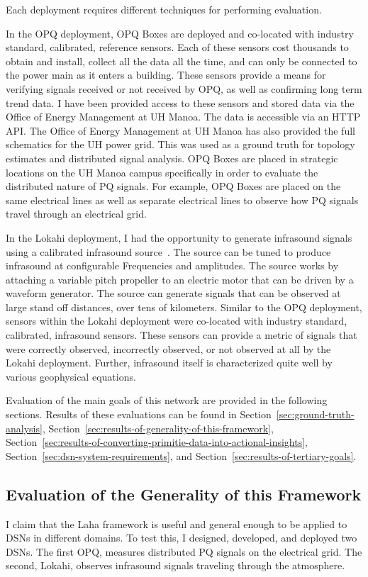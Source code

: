 Each deployment requires different techniques for performing evaluation.

In the OPQ deployment, OPQ Boxes are deployed and co-located with industry standard, calibrated, reference sensors. Each of these sensors cost thousands to obtain and install, collect all the data all the time, and can only be connected to the power main as it enters a building. These sensors provide a means for verifying signals received or not received by OPQ, as well as confirming long term trend data. I have been provided access to these sensors and stored data via the Office of Energy Management at UH Manoa. The data is accessible via an HTTP API. The Office of Energy Management at UH Manoa has also provided the full schematics for the UH power grid. This was used as a ground truth for topology estimates and distributed signal analysis. OPQ Boxes are placed in strategic locations on the UH Manoa campus specifically in order to evaluate the distributed nature of PQ signals. For example, OPQ Boxes are placed on the same electrical lines as well as separate electrical lines to observe how PQ signals travel through an electrical grid.

In the Lokahi deployment, I had the opportunity to generate infrasound signals using a calibrated infrasound source~\cite{park2009rotary}. The source can be tuned to produce infrasound at configurable Frequencies and amplitudes. The source works by attaching a variable pitch propeller to an electric motor that can be driven by a waveform generator. The source can generate signals that can be observed at large stand off distances, over tens of kilometers. Similar to the OPQ deployment, sensors within the Lokahi deployment were co-located with industry standard, calibrated, infrasound sensors. These sensors can provide a metric of signals that were correctly observed, incorrectly observed, or not observed at all by the Lokahi deployment. Further, infrasound itself is characterized quite well by various geophysical equations.

Evaluation of the main goals of this network are provided in the following sections. Results of these evaluations can be found in Section~\ref{sec:ground-truth-analysis}, Section~\ref{sec:results-of-generality-of-this-framework}, Section~\ref{sec:results-of-converting-primitie-data-into-actional-insights}, Section~\ref{sec:dsn-system-requirements}, and Section~\ref{sec:results-of-tertiary-goals}.

\subsection{Evaluation of the Generality of this Framework}\label{subsec:evaluation-of-the-generality-of-this-framework}
I claim that the Laha framework is useful and general enough to be applied to DSNs in different domains. To test this, I designed, developed, and deployed two DSNs. The first OPQ, measures distributed PQ signals on the electrical grid. The second, Lokahi, observes infrasound signals traveling through the atmosphere.

